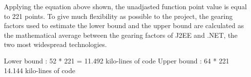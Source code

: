 Applying the equation above shown, the unadjasted function point value is equal to 221 points.
To give much flexibility as possible to the project, the gearing factors used to estimate the lower bound and the upper bound are calculated as the
mathematical average between the gearing factors of J2EE and .NET, the two most widespread technologies.

Lower bound : 52 * 221 = 11.492 kilo-lines of code
Upper bound : 64 * 221 14.144 kilo-lines of code
